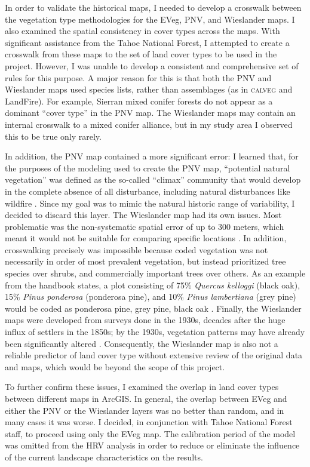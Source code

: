 In order to validate the historical maps, I needed to develop a crosswalk between the vegetation type methodologies for the EVeg, PNV, and Wieslander maps. I also examined the spatial consistency in cover types across the maps. With significant assistance from the Tahoe National Forest, I attempted to create a crosswalk from these maps to the set of land cover types to be used in the project. However, I was unable to develop a consistent and comprehensive set of rules for this purpose. A major reason for this is that both the PNV and Wieslander maps used species lists, rather than assemblages (as in \textsc{calveg} and LandFire). For example, Sierran mixed conifer forests do not appear as a dominant ``cover type'' in the PNV map. The Wieslander maps may contain an internal crosswalk to a mixed conifer alliance, but in my study area I observed this to be true only rarely. 

In addition, the PNV map contained a more significant error: I learned that, for the purposes of the modeling used to create the PNV map, ``potential natural vegetation'' was defined as the so-called ``climax'' community that would develop in the complete absence of all disturbance, including natural disturbances like wildfire \citep{Fites1993}. Since my goal was to mimic the natural historic range of variability, I decided to discard this layer. The Wieslander map had its own issues. Most problematic was the non-systematic spatial error of up to 300 meters, which meant it would not be suitable for comparing specific locations \citep{Thorne2006}. In addition, crosswalking precisely was impossible because coded vegetation was not necessarily in order of most prevalent vegetation, but instead prioritized tree species over shrubs, and commercially important trees over others. As an example from the handbook states, a plot consisting of 75\% \emph{Quercus kelloggi} (black oak), 15\% \emph{Pinus ponderosa} (ponderosa pine), and 10\% \emph{Pinus lambertiana} (grey pine) would be coded as ponderosa pine, grey pine, black oak \citep{Thorne2006}. Finally, the Wieslander maps were developed from surveys done in the 1930s, decades after the huge influx of settlers in the 1850s; by the 1930s, vegetation patterns may have already been significantly altered \citep{Thorne2006}. Consequently, the Wieslander map is also not a reliable predictor of land cover type without extensive review of the original data and maps, which would be beyond the scope of this project. 

To further confirm these issues, I examined the overlap in land cover types between different maps in ArcGIS. In general, the overlap between EVeg and either the PNV or the Wieslander layers was no better than random, and in many cases it was worse. I decided, in conjunction with Tahoe National Forest staff, to proceed using only the EVeg map. The calibration period of the model was omitted from the HRV analysis in order to reduce or eliminate the influence of the current landscape characteristics on the results.



